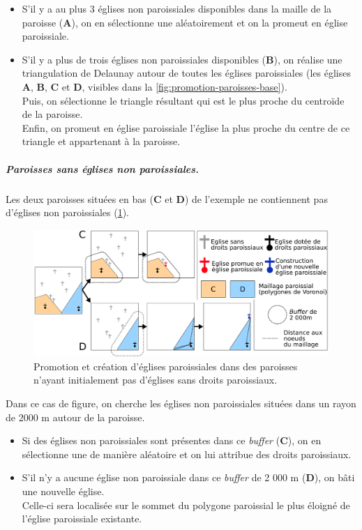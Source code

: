 \begin{itemize}
	\item S'il y a au plus 3 églises non paroissiales disponibles dans la maille de la paroisse (\textbf{A}), on en sélectionne une aléatoirement et on la promeut en église paroissiale.
	
	\item S'il y a plus de trois églises non paroissiales disponibles (\textbf{B}), on réalise une triangulation de Delaunay autour de toutes les églises paroissiales (les églises \textbf{A}, \textbf{B}, \textbf{C} et \textbf{D}, visibles dans la \cref{fig:promotion-paroisses-base}).\\
	Puis, on sélectionne le triangle résultant qui est le plus proche du centroïde de la paroisse.\\
	Enfin, on promeut en église paroissiale l'église la plus proche du centre de ce triangle et appartenant à la paroisse.	
\end{itemize}


\subparagraph{Paroisses sans églises non paroissiales.}

Les deux paroisses situées en bas (\textbf{C} et \textbf{D}) de l'exemple ne contiennent pas d'églises non paroissiales (\cref{fig:promotion-paroisses-2}).

\begin{figure}[H]
	\centering
	\includegraphics[width=1\linewidth]{img/promo_creation_paroisses_promo2.pdf}
	\caption{Promotion et création d'églises paroissiales dans des paroisses n'ayant initialement pas d'églises sans droits paroissiaux.}
	\label{fig:promotion-paroisses-2}
\end{figure}

Dans ce cas de figure, on cherche les églises non paroissiales situées dans un rayon de 2000 m autour de la paroisse.
\begin{itemize}
	\item Si des églises non paroissiales sont présentes dans ce \textit{buffer} (\textbf{C}), on en sélectionne une de manière aléatoire et on lui attribue des droits paroissiaux.
	
	\item S'il n'y a aucune église non paroissiale dans ce \textit{buffer} de 2 000 m (\textbf{D}), on bâti une nouvelle église.\\
	Celle-ci sera localisée sur le sommet du polygone paroissial le plus éloigné de l'église paroissiale existante.
\end{itemize}

